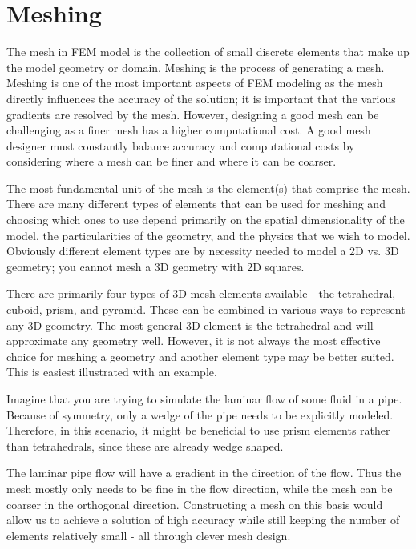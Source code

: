 \section{Meshing}\label{sec:meshing}

The mesh in FEM model is the collection of small discrete elements that make up the model geometry or domain.
Meshing is the process of generating a mesh.
Meshing is one of the most important aspects of FEM modeling as the mesh directly influences the accuracy of the solution; it is important that the various gradients are resolved by the mesh.
However, designing a good mesh can be challenging as a finer mesh has a higher computational cost.
A good mesh designer must constantly balance accuracy and computational costs by considering where a mesh can be finer and where it can be coarser.\par

The most fundamental unit of the mesh is the element(s) that comprise the mesh.
There are many different types of elements that can be used for meshing and choosing which ones to use depend primarily on the spatial dimensionality of the model, the particularities of the geometry, and the physics that we wish to model.
Obviously different element types are by necessity needed to model a 2D vs. 3D geometry; you cannot mesh a 3D geometry with 2D squares.\par

There are primarily four types of 3D mesh elements available - the tetrahedral, cuboid, prism, and pyramid.
These can be combined in various ways to represent any 3D geometry.
The most general 3D element is the tetrahedral and will approximate any geometry well.
However, it is not always the most effective choice for meshing a geometry and another element type may be better suited.
This is easiest illustrated with an example.\par


Imagine that you are trying to simulate the laminar flow of some fluid in a pipe.
Because of symmetry, only a wedge of the pipe needs to be explicitly modeled.
Therefore, in this scenario, it might be beneficial to use prism elements rather than tetrahedrals, since these are already wedge shaped.

The laminar pipe flow will have a gradient in the direction of the flow.
Thus the mesh mostly only needs to be fine in the flow direction, while the mesh can be coarser in the orthogonal direction.
Constructing a mesh on this basis would allow us to achieve a solution of high accuracy while still keeping the number of elements relatively small - all through clever mesh design.\par

